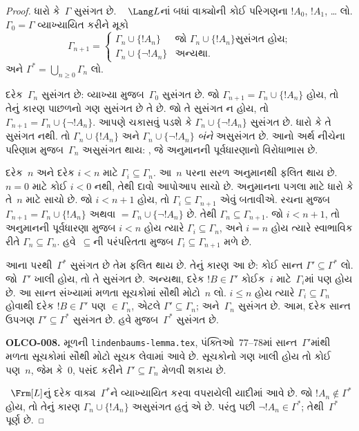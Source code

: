 \begin{proof}
ધારો કે~$\Gamma$ સુસંગત છે. ~ $\Lang L$નાં બધાં વાક્યોની
કોઈ પરિગણના $!A_0$, $!A_1$, \dots{} લો. $\Gamma_0=\Gamma$ વ્યાખ્યાયિત
કરીને મૂકો
\[
\Gamma_{n+1} =
\begin{cases}
\Gamma_n \cup \{ !A_n \} & \textrm{જો $\Gamma_n \cup \{!A_n\}$
  સુસંગત હોય;} \\
\Gamma_n \cup \{ \lnot !A_n \} & \textrm{અન્યથા.}
\end{cases}
\]
અને $\Gamma^*=\bigcup_{n\geq 0}\Gamma_n$ લો.

દરેક~$\Gamma_n$ સુસંગત છે: વ્યાખ્યા મુજબ~$\Gamma_0$ સુસંગત છે. જો
$\Gamma_{n+1}=\Gamma_n\cup\{!A_n\}$ હોય, તો તેનું કારણ પાછળનો ગણ
સુસંગત છે તે છે. જો તે સુસંગત ન હોય, તો
$\Gamma_{n+1}=\Gamma_n\cup\{\lnot !A_n\}$. આપણે ચકાસવું પડશે કે
$\Gamma_n\cup\{\lnot !A_n\}$ સુસંગત છે. ધારો કે તે સુસંગત નથી. તો
$\Gamma_n\cup\{!A_n\}$ અને $\Gamma_n\cup\{\lnot !A_n\}$ \emph{બંને}
અસુસંગત છે. આનો અર્થ નીચેના પરિણામ મુજબ~$\Gamma_n$ અસુસંગત થાય:
%
  ,
જે અનુમાનની પૂર્વધારણાનો વિરોધાભાસ છે.

દરેક~$n$ અને દરેક $i<n$ માટે $\Gamma_i\subseteq\Gamma_n$. આ~$n$ પરના
સરળ અનુમાનથી ફલિત થાય છે. $n=0$ માટે કોઈ $i<0$ નથી, તેથી દાવો આપોઆપ
સાચો છે. અનુમાનના પગલા માટે ધારો કે તે~$n$ માટે સાચો છે. જો $i<n+1$
હોય, તો $\Gamma_i\subseteq\Gamma_{n+1}$ એવું બતાવીએ. રચના મુજબ
$\Gamma_{n+1}=\Gamma_n\cup\{!A_n\}$ અથવા
$=\Gamma_n\cup\{\lnot !A_n\}$ છે. તેથી
$\Gamma_n\subseteq\Gamma_{n+1}$. જો $i<n+1$, તો અનુમાનની પૂર્વધારણા
મુજબ $i<n$ હોય ત્યારે $\Gamma_i\subseteq\Gamma_n$, અને $i=n$ હોય
ત્યારે સ્વાભાવિક રીતે $\Gamma_n\subseteq\Gamma_n$. હવે~$\subseteq$ની
પરંપરિતતા મુજબ $\Gamma_i\subseteq\Gamma_{n+1}$ મળે છે.

આના પરથી~$\Gamma^*$ સુસંગત છે તેમ ફલિત થાય છે. તેનું કારણ આ છે:
કોઈ સાન્ત $\Gamma'\subseteq\Gamma^*$ લો. જો~$\Gamma'$ ખાલી હોય, તો તે
સુસંગત છે. અન્યથા, દરેક $!B\in\Gamma'$ કોઈક~$i$ માટે~$\Gamma_i$માં
પણ હોય છે. આ સાન્ત સંખ્યામાં મળતા સૂચકોમાં સૌથી મોટો~$n$ લો. $i\le n$ હોય ત્યારે
$\Gamma_i\subseteq\Gamma_n$ હોવાથી દરેક $!B\in\Gamma'$ પણ
$\in\Gamma_n$, એટલે $\Gamma'\subseteq\Gamma_n$; અને~$\Gamma_n$
સુસંગત છે. આમ, દરેક સાન્ત ઉપગણ $\Gamma'\subseteq\Gamma^*$ સુસંગત છે. હવે
%
   મુજબ~$\Gamma^*$ સુસંગત
છે.

\begin{editorial}
\textbf{OLCO-008.} મૂળની \texttt{lindenbaums-lemma.tex}, પંક્તિઓ~77--78માં સાન્ત~$\Gamma'$માંથી મળતા સૂચકોમાં સૌથી મોટો સૂચક લેવામાં આવે છે. સૂચકોનો ગણ ખાલી હોય તો કોઈ પણ~$n$, જેમ કે~$0$, પસંદ કરીને $\Gamma'\subseteq\Gamma_n$ મેળવી શકાય છે.
\end{editorial}

~$\Frm[L]$નું દરેક વાક્ય~$\Gamma^*$ને વ્યાખ્યાયિત કરવા વપરાયેલી
યાદીમાં આવે છે. જો $!A_n\notin\Gamma^*$ હોય, તો તેનું કારણ
$\Gamma_n\cup\{!A_n\}$ અસુસંગત હતું એ છે. પરંતુ પછી $\lnot !A_n\in
\Gamma^*$; તેથી~$\Gamma^*$ પૂર્ણ છે.
\end{proof}
